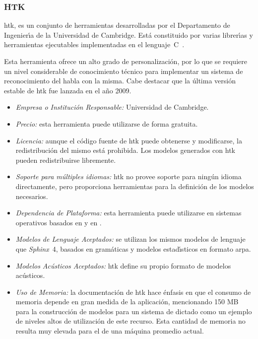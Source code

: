 \subsubsection{HTK}
\label{sec:htk}

\gls{htk}, es un conjunto de herramientas
desarrolladas por el Departamento de Ingenier{\'\i}a de la Universidad de Cambridge. Est\'a constituido
por varias librer{\'\i}as y herramientas ejecutables implementadas en el \mbox{lenguaje C \cite{HTKHomePage}}.

Esta herramienta ofrece un alto grado de personalizaci\'on, por lo que se requiere un nivel considerable
de conocimiento t\'ecnico para implementar un sistema de reconocimiento del habla con la misma.
Cabe destacar que la \'ultima versi\'on estable de \gls{htk} fue lanzada en el a\~no 2009.

\begin{itemize}
	\item \emph{Empresa o Instituci\'on Responsable:} Universidad de Cambridge.
	\item \emph{Precio:} esta herramienta puede utilizarse de forma gratuita.
	\item \emph{Licencia:} aunque el c\'odigo fuente de \gls{htk} puede obtenerse y modificarse,
	la redistribuci\'on del mismo est\'a prohibida. Los modelos generados con \gls{htk} pueden
	redistribuirse libremente.
	\item \emph{Soporte para m\'ultiples idiomas:} \gls{htk} no provee soporte para ning\'un
	idioma directamente, pero proporciona herramientas para la definici\'on de los modelos necesarios.
	\item \emph{Dependencia de Plataforma:} esta herramienta puede utilizarse en sistemas operativos
	basados en  y en .
	\item \emph{Modelos de Lenguaje Aceptados:} se utilizan los mismos modelos de lenguaje que 
	\mbox{\emph{Sphinx} 4}, basados en gram\'aticas y modelos estad{\'\i}sticos en formato \gls{arpa}.
	\item \emph{Modelos Ac\'usticos Aceptados:} \gls{htk} define su propio formato de modelos ac\'usticos.
	\item \emph{Uso de Memoria:} la documentaci\'on de \gls{htk} hace \'enfasis en que el consumo de memoria depende en
	gran medida de la aplicaci\'on, mencionando 150 MB para la construcci\'on de modelos para un sistema de
	dictado como un ejemplo de niveles altos de utilizaci\'on de este recurso.
	Esta cantidad de memoria no resulta muy elevada para el  de una m\'aquina promedio actual.
\end{itemize}